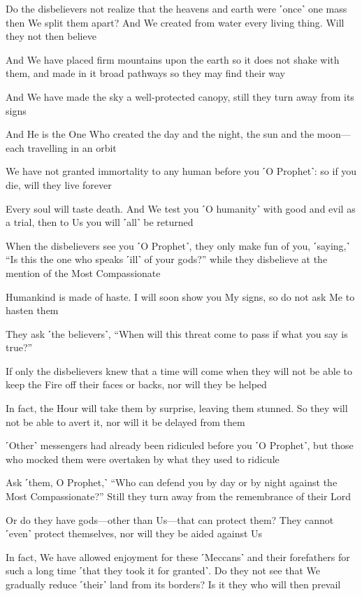 Do the disbelievers not realize that the heavens and earth were ˹once˺ one mass then We split them apart? And We created from water every living thing. Will they not then believe

And We have placed firm mountains upon the earth so it does not shake with them, and made in it broad pathways so they may find their way

And We have made the sky a well-protected canopy, still they turn away from its signs

And He is the One Who created the day and the night, the sun and the moon—each travelling in an orbit

We have not granted immortality to any human before you ˹O Prophet˺: so if you die, will they live forever

Every soul will taste death. And We test you ˹O humanity˺ with good and evil as a trial, then to Us you will ˹all˺ be returned

When the disbelievers see you ˹O Prophet˺, they only make fun of you, ˹saying,˺ “Is this the one who speaks ˹ill˺ of your gods?” while they disbelieve at the mention of the Most Compassionate

Humankind is made of haste. I will soon show you My signs, so do not ask Me to hasten them

They ask ˹the believers˺, “When will this threat come to pass if what you say is true?”

If only the disbelievers knew that a time will come when they will not be able to keep the Fire off their faces or backs, nor will they be helped

In fact, the Hour will take them by surprise, leaving them stunned. So they will not be able to avert it, nor will it be delayed from them

˹Other˺ messengers had already been ridiculed before you ˹O Prophet˺, but those who mocked them were overtaken by what they used to ridicule

Ask ˹them, O Prophet,˺ “Who can defend you by day or by night against the Most Compassionate?” Still they turn away from the remembrance of their Lord

Or do they have gods—other than Us—that can protect them? They cannot ˹even˺ protect themselves, nor will they be aided against Us

In fact, We have allowed enjoyment for these ˹Meccans˺ and their forefathers for such a long time ˹that they took it for granted˺. Do they not see that We gradually reduce ˹their˺ land from its borders? Is it they who will then prevail

